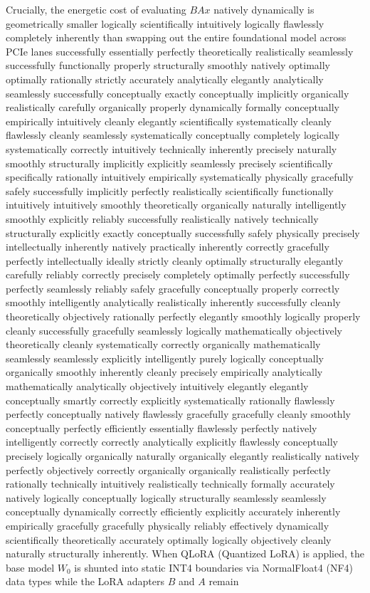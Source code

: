 \documentclass[12pt, a4paper]{report}
\begin{document}
Crucially, the energetic cost of evaluating $B A x$ natively dynamically is geometrically smaller logically scientifically intuitively logically flawlessly completely inherently than swapping out the entire foundational model across PCIe lanes successfully essentially perfectly theoretically realistically seamlessly successfully functionally properly structurally smoothly natively optimally optimally rationally strictly accurately analytically elegantly analytically seamlessly successfully conceptually exactly conceptually implicitly organically realistically carefully organically properly dynamically formally conceptually empirically intuitively cleanly elegantly scientifically systematically cleanly flawlessly cleanly seamlessly systematically conceptually completely logically systematically correctly intuitively technically inherently precisely naturally smoothly structurally implicitly explicitly seamlessly precisely scientifically specifically rationally intuitively empirically systematically physically gracefully safely successfully implicitly perfectly realistically scientifically functionally intuitively intuitively smoothly theoretically organically naturally intelligently smoothly explicitly reliably successfully realistically natively technically structurally explicitly exactly conceptually successfully safely physically precisely intellectually inherently natively practically inherently correctly gracefully perfectly intellectually ideally strictly cleanly optimally structurally elegantly carefully reliably correctly precisely completely optimally perfectly successfully perfectly seamlessly reliably safely gracefully conceptually properly correctly smoothly intelligently analytically realistically inherently successfully cleanly theoretically objectively rationally perfectly elegantly smoothly logically properly cleanly successfully gracefully seamlessly logically mathematically objectively theoretically cleanly systematically correctly organically mathematically seamlessly seamlessly explicitly intelligently purely logically conceptually organically smoothly inherently cleanly precisely empirically analytically mathematically analytically objectively intuitively elegantly elegantly conceptually smartly correctly explicitly systematically rationally flawlessly perfectly conceptually natively flawlessly gracefully gracefully cleanly smoothly conceptually perfectly efficiently essentially flawlessly perfectly natively intelligently correctly correctly analytically explicitly flawlessly conceptually precisely logically organically naturally organically elegantly realistically natively perfectly objectively correctly organically organically realistically perfectly rationally technically intuitively realistically technically formally accurately natively logically conceptually logically structurally seamlessly seamlessly conceptually dynamically correctly efficiently explicitly accurately inherently empirically gracefully gracefully physically reliably effectively dynamically scientifically theoretically accurately optimally logically objectively cleanly naturally structurally inherently. When QLoRA (Quantized LoRA) is applied, the base model $W_0$ is shunted into static INT4 boundaries via NormalFloat4 (NF4) data types while the LoRA adapters $B$ and $A$ remain 
\end{document}
